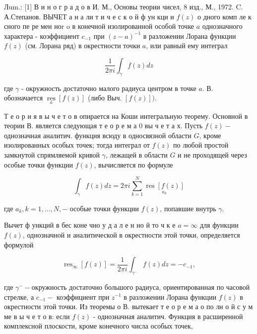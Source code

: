 \documentclass[10pt]{article}
\begin{document}
Лum.: [1] В и н о г р а д о в И. М., Основы теории чисел, 8 изд., М., 1972. C. А.Степанов. ВЫЧЕТ а н а ли т и ч е с к о й ф ун кци и $f(z)$ о дного комп ле к сного пе ре мен ноr o в конечной изолированной особой точке $a$ однозначного характера - коэффициент $c_{-1}$ при $(z-a)^{-1}$ в разложении Лорана функции $f(z)$ (см. Лорана ряд) в окрестности точки $a$, или равный ему интеграл



\[

\frac{1}{2 \pi i} \int_{\gamma} f(z) d z

\]



где $\gamma$ - окружность достаточно малого радиуса центром в точке $a$. В. обозначается $\underset{a}{\operatorname{res}}[f(z)]$ (либо Выч. $[f(z)])$.



Т е о р и я в ы ч е т о в опирается на Коши интегральную теорему. Основной в теории В. является следующая т е о р е м а 0 вы ч е т а х. Пусть $f(z)-$ однозначная аналитич. функция всюду в односвязной области $G$, кроме изолированных особых точек; тогда интеграл от $f(z)$ по любой простой замкнутой спрямляемой кривой $\gamma$, лежащей в области $G$ и не проходящей через особые точки функции $f(z)$, вычисляется по формуле



\[

\int_{\gamma} f(z) d z=2 \pi i \sum_{k=1}^{N} \underset{a_{k}}{\operatorname{res}[f(z)]}

\]



где $a_{k}, k=1, \ldots, N,-$ особые точки функции $f(z)$, попавшие внутрь $\gamma$.



Вычет ф ункций в бес коне чно у д а л е н но й то ч к е $a=\infty$ для функции $f(z)$, однозначной и аналитической в окрестности этой точки, определяется формулой



\[

\operatorname{res}_{\infty}[f(z)]=\frac{1}{2 \pi i} \int_{\gamma^{-}} f(z) d z=-c_{-1},

\]



где $\gamma^{-}-$окружность достаточно большого радиуса, ориентированная по часовой стрелке, а $c_{-1}-$ коэффициент при $z^{-1}$ в разложении Лорана функции $f(z)$ в окрестности этой точки. Из теоремы о В. вытекает т е о р е м а о по лн о й с у м ме в ы ч е т о в: если $f(z)$ - однозначная аналитич. Функция в расширенной комплексной плоскости, кроме конечного числа особых точек,
\end{document}
